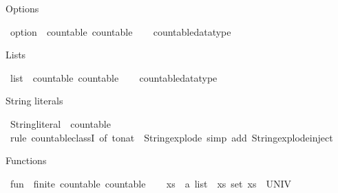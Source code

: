 \begin{isabellebody}
\endisatagproof
{\isafoldproof}%
%
\isadelimproof
%
\endisadelimproof
%
\begin{isamarkuptext}%
Options%
\end{isamarkuptext}\isamarkuptrue%
\isamarkupfalse%
\ option\ {\isacharcolon}{\isacharcolon}\ {\isacharparenleft}countable{\isacharparenright}\ countable\isanewline
%
\isadelimproof
\ \ %
\endisadelimproof
%
\isatagproof
{}\isamarkupfalse%
\ countable{\isacharunderscore}datatype%
\endisatagproof
{\isafoldproof}%
%
\isadelimproof
%
\endisadelimproof
%
\begin{isamarkuptext}%
Lists%
\end{isamarkuptext}\isamarkuptrue%
\isamarkupfalse%
\ list\ {\isacharcolon}{\isacharcolon}\ {\isacharparenleft}countable{\isacharparenright}\ countable\isanewline
%
\isadelimproof
\ \ %
\endisadelimproof
%
\isatagproof
{}\isamarkupfalse%
\ countable{\isacharunderscore}datatype%
\endisatagproof
{\isafoldproof}%
%
\isadelimproof
%
\endisadelimproof
%
\begin{isamarkuptext}%
String literals%
\end{isamarkuptext}\isamarkuptrue%
\isamarkupfalse%
\ String{\isachardot}literal\ {\isacharcolon}{\isacharcolon}\ countable\isanewline
%
\isadelimproof
\ \ %
\endisadelimproof
%
\isatagproof
{}\isamarkupfalse%
\ {\isacharparenleft}rule\ countable{\isacharunderscore}classI\ {\isacharbrackleft}of\ {\isachardoublequoteopen}to{\isacharunderscore}nat\ {\isasymcirc}\ String{\isachardot}explode{\isachardoublequoteclose}{\isacharbrackright}{\isacharparenright}\ {\isacharparenleft}simp\ add{\isacharcolon}\ String{\isachardot}explode{\isacharunderscore}inject{\isacharparenright}%
\endisatagproof
{\isafoldproof}%
%
\isadelimproof
%
\endisadelimproof
%
\begin{isamarkuptext}%
Functions%
\end{isamarkuptext}\isamarkuptrue%
\isamarkupfalse%
\ {\isachardoublequoteopen}fun{\isachardoublequoteclose}\ {\isacharcolon}{\isacharcolon}\ {\isacharparenleft}finite{\isacharcomma}\ countable{\isacharparenright}\ countable\isanewline
%
\isadelimproof
%
\endisadelimproof
%
\isatagproof
{}\isamarkupfalse%
\isanewline
\ \ \isamarkupfalse%
\ xs\ {\isacharcolon}{\isacharcolon}\ {\isachardoublequoteopen}{\isacharprime}a\ list{\isachardoublequoteclose}\ \ xs{\isacharcolon}\ {\isachardoublequoteopen}set\ xs\ {\isacharequal}\ UNIV{\isachardoublequoteclose}\isanewline

\end{isabellebody}
